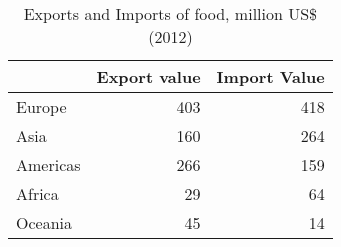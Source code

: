 \begin{table}
\centering
\caption{ Exports and Imports of food, million US\$ (2012)} 
{\footnotesize
\begin{tabular}{p{1.0cm}rr}
  \toprule
 & Export value & Import Value \\ 
  \midrule
Europe & 403 & 418 \\ 
  Asia & 160 & 264 \\ 
  Americas & 266 & 159 \\ 
  Africa & 29 & 64 \\ 
  Oceania & 45 & 14 \\ 
   \bottomrule
\end{tabular}
}
\end{table}
